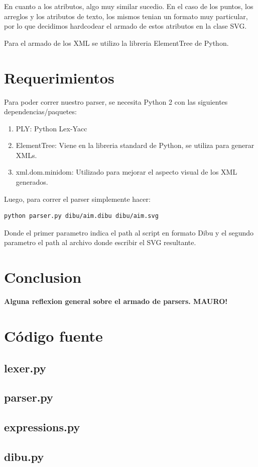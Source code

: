 \documentclass{article}
\theoremstyle{definition}
\theoremstyle{remark}
\begin{document}
En cuanto a los atributos, algo muy similar sucedio. En el caso de los puntos, los arreglos y los atributos de texto, los mismos tenian un formato muy particular, por lo que decidimos hardcodear el armado de estos atributos en la clase SVG.

Para el armado de los XML se utilizo la libreria ElementTree de Python.

\section{Requerimientos}

Para poder correr nuestro parser, se necesita Python 2 con las siguientes dependencias/paquetes:

\begin{enumerate}
	\item PLY: Python Lex-Yacc
	\item ElementTree: Viene en la libreria standard de Python, se utiliza para generar XMLs.
	\item xml.dom.minidom: Utilizado para mejorar el aspecto visual de los XML generados.
\end{enumerate}

Luego, para correr el parser simplemente hacer:
\begin{verbatim}
python parser.py dibu/aim.dibu dibu/aim.svg
\end{verbatim}

Donde el primer parametro indica el path al script en formato Dibu y el segundo parametro el path al archivo donde escribir el SVG resultante.

\section{Conclusion}

\textbf{Alguna reflexion general sobre el armado de parsers. MAURO!}

\pagebreak

\section{Código fuente}

\subsection{lexer.py}


\subsection{parser.py}
\begin{small}
  
\end{small}
\subsection{expressions.py}
\begin{small}
  
\end{small}

\subsection{dibu.py}
\begin{small}
  
\end{small}
\end{document}
